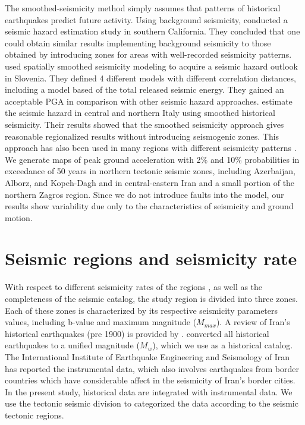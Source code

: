 The smoothed-seismicity method simply assumes that patterns of historical earthquakes predict future activity. Using background seismicity, \citet{Cao1996} conducted a seismic hazard estimation study in southern California. They concluded that one could obtain similar results implementing background seismicity to those obtained by introducing zones for areas with well-recorded seismicity patterns. \citet{Lapajne1997} used spatially smoothed seismicity modeling to acquire a seismic hazard outlook in Slovenia. They defined 4 different models with different correlation distances, including a model based of the total released seismic energy. They gained an acceptable PGA in comparison with other seismic hazard approaches. \citet{Akinci2004} estimate the seismic hazard in central and northern Italy using smoothed historical seismicity. Their results showed that the smoothed seismicity approach gives reasonable regionalized results without introducing seismogenic zones. This approach has also been used in many regions with different seismicity patterns \citep{Wesson1999, Klein2001, Hamdache2008, Kalkan2009, Moschetti2014, Boyd2008}. We generate maps of peak ground acceleration with 2\% and 10\% probabilities in exceedance of 50 years in northern tectonic seismic zones, including Azerbaijan, Alborz, and Kopeh-Dagh and in central-eastern Iran and a small portion of the northern Zagros region. Since we do not introduce faults into the model, our results show variability due only to the characteristics of seismicity and ground motion. 



\section{Seismic regions and seismicity rate}
With respect to different seismicity rates of the regions \cite{Nemati2015}, as well as the completeness of the seismic catalog, the study region is divided into three zones. Each of these zones is characterized by its respective seismicity parameters values, including b-value and maximum magnitude ($M{_{max}}$). A review of Iran's historical earthquakes (pre 1900) is provided by \citet{Ambraseys2005}. \citet{Karimiparidari2013} converted all historical earthquakes to a unified magnitude ($M_w$), which we use as a historical catalog. The International Institute of Earthquake Engineering and Seismology of Iran \citep{IIEES} has reported the instrumental data, which also involves earthquakes from border countries which have considerable affect in the seismicity of Iran's border cities. 
In the present study, historical data are integrated with instrumental data. We use the tectonic seismic division to categorized the data according to the seismic tectonic regions. 
